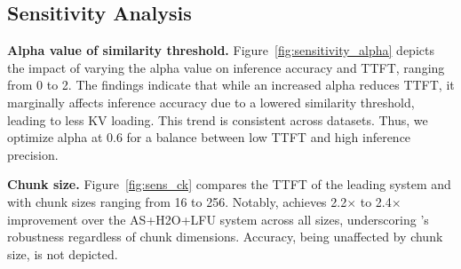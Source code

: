 \subsection{Sensitivity Analysis}
\label{exp:sensi}


%	

\noindent \textbf{Alpha value of similarity threshold.} 
Figure~\ref{fig:sensitivity_alpha} depicts the impact of varying the alpha value on inference accuracy and TTFT, ranging from 0 to 2. The findings indicate that while an increased alpha reduces TTFT, it marginally affects inference accuracy due to a lowered similarity threshold, leading to less KV loading. This trend is consistent across datasets. Thus, we optimize alpha at 0.6 for a balance between low TTFT and high inference precision.

\noindent \textbf{Chunk size.} 
Figure~\ref{fig:sens_ck} compares the TTFT of the leading system and \pname{} with chunk sizes ranging from 16 to 256. Notably, \pname{} achieves 2.2$\times$ to 2.4$\times$ improvement over the AS+H2O+LFU system across all sizes, underscoring \pname{}'s robustness regardless of chunk dimensions. Accuracy, being unaffected by chunk size, is not depicted.







